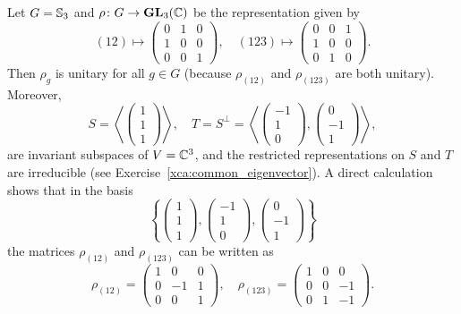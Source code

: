 \begin{example}
    Let $G=\mathbb{S}_3$ and $\rho\colon G\to\mathbf{GL}_3(\mathbb{C})$ be the representation given by
    \[
    (12)\mapsto\begin{pmatrix}
    0&1&0\\
    1&0&0\\
    0&0&1
    \end{pmatrix},\quad
    (123)\mapsto\begin{pmatrix}
    0&0&1\\
    1&0&0\\
    0&1&0
    \end{pmatrix}.
    \]
    Then $\rho_g$ is unitary for all $g\in G$ (because $\rho_{(12)}$ and $\rho_{(123)}$ are both
    unitary). Moreover,
    \[
    S=\left\langle \begin{pmatrix}
    1\\1\\1
    \end{pmatrix}
    \right\rangle,
    \quad
    T=S^{\perp}=\left\langle
    \begin{pmatrix}
    -1\\1\\0
    \end{pmatrix},
    \begin{pmatrix}
    0\\-1\\1
    \end{pmatrix}
    \right\rangle,
    \]
    are invariant subspaces of $V=\mathbb{C}^3$, and the restricted representations on
    $S$ and $T$ are irreducible (see Exercise~\ref{xca:common_eigenvector}). A
    direct calculation shows that in the basis 
    \[
      \left\{\begin{pmatrix}
    1\\1\\1
    \end{pmatrix},
    \begin{pmatrix}
    -1\\1\\0
    \end{pmatrix},
    \begin{pmatrix}
    0\\-1\\1
    \end{pmatrix}
    \right\}
  \]
    the matrices $\rho_{(12)}$ and $\rho_{(123)}$ can be written as
    \[
    \rho_{(12)}=\begin{pmatrix}
        1&0&0\\
        0&-1&1\\
        0&0&1
    \end{pmatrix},
    \quad
    \rho_{(123)}=
    \begin{pmatrix}
        1&0&0\\
        0&0&-1\\
        0&1&-1
    \end{pmatrix}.
    \]
\end{example}

